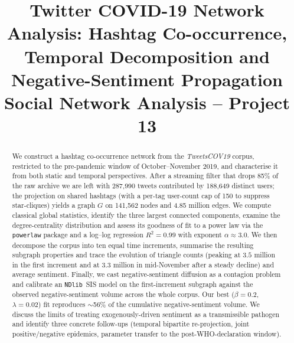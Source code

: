 \documentclass[conference]{IEEEtran}
\begin{document}
\title{Twitter COVID-19 Network Analysis: Hashtag Co-occurrence,
Temporal Decomposition and Negative-Sentiment Propagation\\
\large{Social Network Analysis -- Project 13}}

\author{
}

\maketitle

\begin{abstract}
We construct a hashtag co-occurrence network from the
\textit{TweetsCOV19} corpus, restricted to the pre-pandemic window
of October--November 2019, and characterise it from
both static and temporal perspectives.  After a streaming filter that
drops 85\% of the raw archive we are left with 287{,}990 tweets
contributed by 188{,}649 distinct users; the projection on shared
hashtags (with a per-tag user-count cap of 150 to suppress
star-cliques) yields a graph $G$ on 141{,}562 nodes and 4.85
million edges.  We compute classical global statistics, identify the
three largest connected components, examine the degree-centrality
distribution and assess its goodness of fit to a power law via the
\texttt{powerlaw} package and a log--log regression $R^{2} = 0.99$
with exponent $\alpha\approx 3.0$.  We then decompose the corpus
into ten equal time increments, summarise the resulting subgraph
properties and trace the evolution of triangle counts (peaking at
$3.5$ million in the first increment and at $3.3$ million in
mid-November after a steady decline) and average sentiment.  Finally,
we cast negative-sentiment diffusion as a contagion problem and
calibrate an \texttt{NDlib}~SIS model on the first-increment
subgraph against the observed negative-sentiment volume across the
whole corpus.  Our best ($\beta=0.2$, $\lambda=0.02$) fit
reproduces $\sim$56\% of the cumulative negative-sentiment
volume.  We discuss the limits of treating exogenously-driven
sentiment as a transmissible pathogen and identify three concrete
follow-ups (temporal bipartite re-projection, joint
positive/negative epidemics, parameter transfer to the
post-WHO-declaration window).
\end{abstract}
\end{document}
